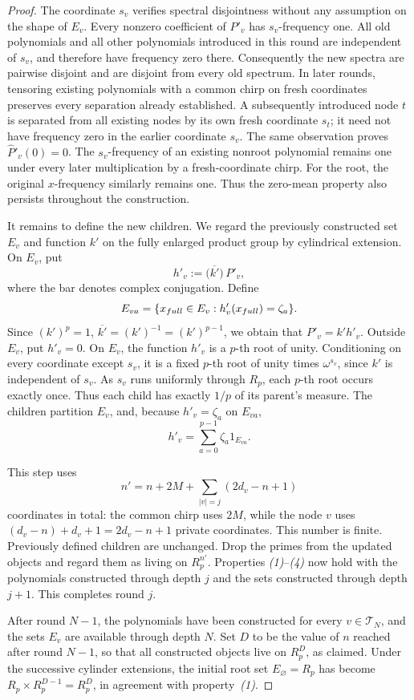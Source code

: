 \documentclass[10pt,a4paper]{amsart}
\newcommand{\R}{R}
\newcommand{\T}{\mathcal T}
\begin{document}
\begin{proof}
The coordinate \(s_v\) verifies spectral disjointness without any
assumption on the shape of \(E_v\). Every nonzero coefficient of
\(P'_v\) has \(s_v\)-frequency one. All old polynomials and all
other polynomials introduced in this round are independent of
\(s_v\), and therefore
have frequency zero there. Consequently the new spectra are
pairwise disjoint and are disjoint from every old spectrum.
In later rounds, tensoring existing polynomials with a common chirp
on fresh coordinates preserves every separation already established.
A subsequently introduced node \(t\) is separated from all existing
nodes by its own fresh coordinate \(s_t\); it need not have
frequency zero in the earlier coordinate \(s_v\).
The same observation proves \(\widehat P'_v(0)=0\).
The \(s_v\)-frequency of an existing nonroot polynomial remains one
under every later multiplication by a fresh-coordinate chirp.
For the root, the original \(x\)-frequency similarly remains one.
Thus the zero-mean property also persists throughout the construction.

It remains to define the new children. 
We regard the previously constructed set \(E_v\) and function \(k'\) on the fully enlarged product group by cylindrical extension. On \(E_v\), put
\[
 h'_v:=\overline{\bigl(k'\bigr)}\,P'_v,
\]
where the bar denotes complex conjugation.
Define
\[
 E_{va}=\{x_{\rm full}\in E_v:h'_v(x_{\rm full})=\zeta_a\}.
\]
Since \((k')^p=1\),
\(\overline{k'}=(k')^{-1}=(k')^{p-1}\), we obtain that \(P'_v=k'h'_v\).
Outside \(E_v\), put \(h'_v=0\).
On \(E_v\), the function \(h'_v\) is a \(p\)-th root of unity.
Conditioning on every coordinate except \(s_v\), it is a fixed
\(p\)-th root of unity times \(\omega^{s_v}\), since \(k'\) is
independent of \(s_v\). As \(s_v\) runs uniformly through \(\R_p\),
each \(p\)-th root occurs exactly once. Thus each child has exactly
\(1/p\) of its parent's measure. The children partition \(E_v\), and,
because \(h'_v=\zeta_a\) on \(E_{va}\),
\[
 h'_v=\sum_{a=0}^{p-1}\zeta_a1_{E_{va}}.
\]

This step uses
\[
 n'=n+2M+\sum_{|v|=j}(2d_v-n+1)
\]
coordinates in total: the common chirp uses \(2M\), while the node
\(v\) uses \((d_v-n)+d_v+1=2d_v-n+1\) private coordinates. This
number is finite.
Previously defined children are unchanged. Drop the primes from the
updated objects and regard them as living on \(\R_p^{n'}\). Properties
\emph{(1)}--\emph{(4)} now hold with the polynomials constructed
through depth \(j\) and the sets constructed through depth \(j+1\).
This completes round \(j\).

After round \(N-1\), the polynomials have been constructed for every
\(v\in\T_N\), and the sets \(E_v\) are available through depth \(N\).
Set \(D\) to be the value of \(n\) reached after round \(N-1\), so
that all constructed objects live on \(\R_p^D\), as claimed.
Under the successive cylinder extensions, the initial root set
\(E_\varnothing=\R_p\) has become
\(\R_p\times\R_p^{D-1}=\R_p^D\), in agreement with property~\emph{(1)}.
\end{proof}
\end{document}
